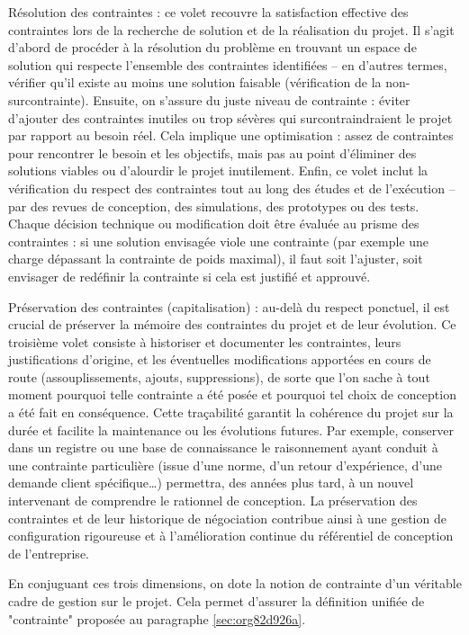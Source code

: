\documentclass[a4paper,12pt]{article}
\begin{document}
Résolution des contraintes : ce volet recouvre la satisfaction effective des contraintes lors de la recherche de solution et de la réalisation du projet. Il s’agit d’abord de procéder à la résolution du problème en trouvant un espace de solution qui respecte l’ensemble des contraintes identifiées – en d’autres termes, vérifier qu’il existe au moins une solution faisable (vérification de la non-surcontrainte). Ensuite, on s’assure du juste niveau de contrainte : éviter d’ajouter des contraintes inutiles ou trop sévères qui surcontraindraient le projet par rapport au besoin réel. Cela implique une optimisation : assez de contraintes pour rencontrer le besoin et les objectifs, mais pas au point d’éliminer des solutions viables ou d’alourdir le projet inutilement. Enfin, ce volet inclut la vérification du respect des contraintes tout au long des études et de l’exécution – par des revues de conception, des simulations, des prototypes ou des tests. Chaque décision technique ou modification doit être évaluée au prisme des contraintes : si une solution envisagée viole une contrainte (par exemple une charge dépassant la contrainte de poids maximal), il faut soit l’ajuster, soit envisager de redéfinir la contrainte si cela est justifié et approuvé.

Préservation des contraintes (capitalisation) : au-delà du respect ponctuel, il est crucial de préserver la mémoire des contraintes du projet et de leur évolution. Ce troisième volet consiste à historiser et documenter les contraintes, leurs justifications d’origine, et les éventuelles modifications apportées en cours de route (assouplissements, ajouts, suppressions), de sorte que l’on sache à tout moment pourquoi telle contrainte a été posée et pourquoi tel choix de conception a été fait en conséquence. Cette traçabilité garantit la cohérence du projet sur la durée et facilite la maintenance ou les évolutions futures. Par exemple, conserver dans un registre ou une base de connaissance le raisonnement ayant conduit à une contrainte particulière (issue d’une norme, d’un retour d’expérience, d’une demande client spécifique…) permettra, des années plus tard, à un nouvel intervenant de comprendre le rationnel de conception. La préservation des contraintes et de leur historique de négociation contribue ainsi à une gestion de configuration rigoureuse et à l’amélioration continue du référentiel de conception de l’entreprise.

En conjuguant ces trois dimensions, on dote la notion de contrainte d’un véritable cadre de gestion sur le projet. Cela permet d’assurer la définition unifiée de "contrainte" proposée au paragraphe \ref{sec:org82d926a}.
\end{document}
